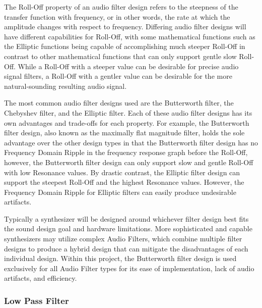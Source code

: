 \documentclass[a4paper,12pt]{report}
\begin{document}
The Roll-Off property of an audio filter design refers to the steepness of the transfer function with frequency, or in other words, the rate at which the amplitude changes with respect to frequency.  Differing audio filter designs will have different capabilities for Roll-Off, with some mathematical functions such as the Elliptic functions being capable of accomplishing much steeper Roll-Off in contrast to other mathematical functions that can only support gentle slow Roll-Off. While a Roll-Off with a steeper value can be desirable for precise audio signal filters, a Roll-Off with a gentler value can be desirable for the more natural-sounding resulting audio signal.

The most common audio filter designs used are the Butterworth filter, the Chebyshev filter, and the Elliptic filter. Each of these audio filter designs has its own advantages and trade-offs for each property. For example, the Butterworth filter design, also known as the maximally flat magnitude filter, holds the sole advantage over the other design types in that the Butterworth filter design has no Frequency Domain Ripple in the frequency response graph before the Roll-Off, however, the Butterworth filter design can only support slow and gentle Roll-Off with low Resonance values. By drastic contrast, the Elliptic filter design can support the steepest Roll-Off and the highest Resonance values. However, the Frequency Domain Ripple for Elliptic filters can easily produce undesirable artifacts.

Typically a synthesizer will be designed around whichever filter design best fits the sound design goal and hardware limitations. More sophisticated and capable synthesizers may utilize complex Audio Filters, which combine multiple filter designs to produce a hybrid design that can mitigate the disadvantages of each individual design. Within this project, the Butterworth filter design is used exclusively for all Audio Filter types for its ease of implementation, lack of audio artifacts, and efficiency.

\subsubsection{Low Pass Filter}

\end{document}
